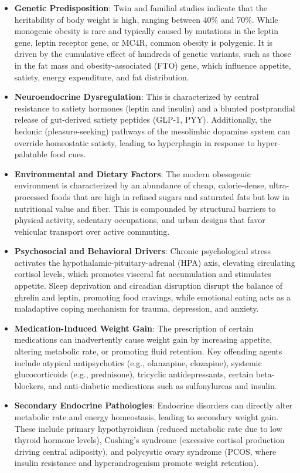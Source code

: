 \begin{itemize}
\item \textbf{Genetic Predisposition}: Twin and familial studies indicate that the heritability of body weight is high, ranging between 40\% and 70\%. While monogenic obesity is rare and typically caused by mutations in the leptin gene, leptin receptor gene, or MC4R, common obesity is polygenic. It is driven by the cumulative effect of hundreds of genetic variants, such as those in the fat mass and obesity-associated (FTO) gene, which influence appetite, satiety, energy expenditure, and fat distribution.
\item \textbf{Neuroendocrine Dysregulation}: This is characterized by central resistance to satiety hormones (leptin and insulin) and a blunted postprandial release of gut-derived satiety peptides (GLP-1, PYY). Additionally, the hedonic (pleasure-seeking) pathways of the mesolimbic dopamine system can override homeostatic satiety, leading to hyperphagia in response to hyper-palatable food cues.
\item \textbf{Environmental and Dietary Factors}: The modern obesogenic environment is characterized by an abundance of cheap, calorie-dense, ultra-processed foods that are high in refined sugars and saturated fats but low in nutritional value and fiber. This is compounded by structural barriers to physical activity, sedentary occupations, and urban designs that favor vehicular transport over active commuting.
\item \textbf{Psychosocial and Behavioral Drivers}: Chronic psychological stress activates the hypothalamic-pituitary-adrenal (HPA) axis, elevating circulating cortisol levels, which promotes visceral fat accumulation and stimulates appetite. Sleep deprivation and circadian disruption disrupt the balance of ghrelin and leptin, promoting food cravings, while emotional eating acts as a maladaptive coping mechanism for trauma, depression, and anxiety.
\item \textbf{Medication-Induced Weight Gain}: The prescription of certain medications can inadvertently cause weight gain by increasing appetite, altering metabolic rate, or promoting fluid retention. Key offending agents include atypical antipsychotics (e.g., olanzapine, clozapine), systemic glucocorticoids (e.g., prednisone), tricyclic antidepressants, certain beta-blockers, and anti-diabetic medications such as sulfonylureas and insulin.
\item \textbf{Secondary Endocrine Pathologies}: Endocrine disorders can directly alter metabolic rate and energy homeostasis, leading to secondary weight gain. These include primary hypothyroidism (reduced metabolic rate due to low thyroid hormone levels), Cushing's syndrome (excessive cortisol production driving central adiposity), and polycystic ovary syndrome (PCOS, where insulin resistance and hyperandrogenism promote weight retention).
\end{itemize}

